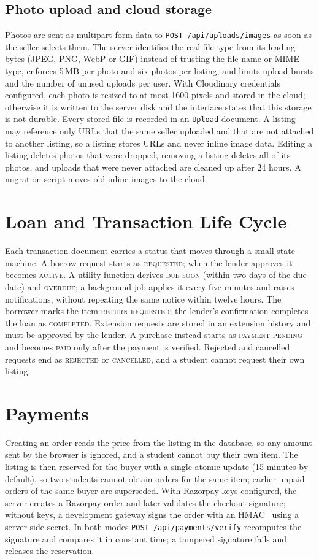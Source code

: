 \documentclass[11pt,letterpaper,oneside]{report}
\newcommand{\code}[1]{\texttt{#1}}
\newcommand{\st}[1]{\textsc{#1}}
\begin{document}
\subsection{Photo upload and cloud storage}
Photos are sent as multipart form data to \code{POST /api/uploads/images} as soon as the seller selects
them. The server identifies the real file type from its leading bytes (JPEG, PNG, WebP or GIF) instead of
trusting the file name or MIME type, enforces 5\,MB per photo and six photos per listing, and limits
upload bursts and the number of unused uploads per user. With Cloudinary credentials configured, each
photo is resized to at most 1600 pixels and stored in the cloud; otherwise it is written to the server
disk and the interface states that this storage is not durable. Every stored file is recorded in an
\code{Upload} document. A listing may reference only URLs that the same seller uploaded and that are not
attached to another listing, so a listing stores URLs and never inline image data. Editing a listing
deletes photos that were dropped, removing a listing deletes all of its photos, and uploads that were
never attached are cleaned up after 24 hours. A migration script moves old inline images to the cloud.

\section{Loan and Transaction Life Cycle}
Each transaction document carries a status that moves through a small state machine. A borrow
request starts as \st{requested}; when the lender approves it becomes \st{active}. A utility function
derives \st{due soon} (within two days of the due date) and \st{overdue}; a background job applies it
every five minutes and raises notifications, without repeating the same notice within twelve hours.
The borrower marks the item \st{return requested}; the lender's confirmation completes the loan as
\st{completed}. Extension requests are stored in an extension history and must be approved by the
lender. A purchase instead starts as \st{payment pending} and becomes \st{paid} only after the
payment is verified. Rejected and cancelled requests end as \st{rejected} or \st{cancelled}, and a
student cannot request their own listing.

\section{Payments}
Creating an order reads the price from the listing in the database, so any amount sent by the browser
is ignored, and a student cannot buy their own item. The listing is then reserved for the buyer with
a single atomic update (15 minutes by default), so two students cannot obtain orders for the same item;
earlier unpaid orders of the same buyer are superseded. With Razorpay keys configured, the server creates
a Razorpay order and later validates the checkout signature; without keys, a development gateway signs the
order with an HMAC~\cite{hmac} using a server-side secret. In both modes \code{POST /api/payments/verify}
recomputes the signature and compares it in constant time; a tampered signature fails and releases the
reservation.
\end{document}
